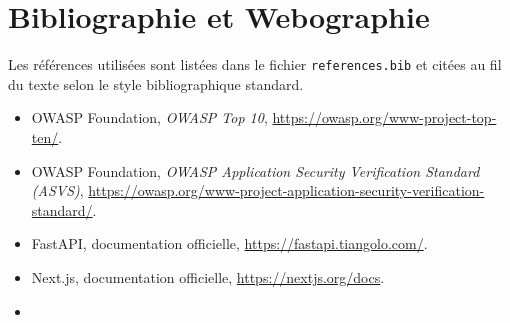\chapter{Bibliographie et Webographie}

Les références utilisées sont listées dans le fichier \texttt{references.bib} et citées
au fil du texte selon le style bibliographique standard. 

\begin{itemize}
    \item OWASP Foundation, \emph{OWASP Top 10}, \url{https://owasp.org/www-project-top-ten/}.
    \item OWASP Foundation, \emph{OWASP Application Security Verification Standard
    (ASVS)}, \url{https://owasp.org/www-project-application-security-verification-standard/}.
    \item FastAPI, documentation officielle, \url{https://fastapi.tiangolo.com/}.
    \item Next.js, documentation officielle, \url{https://nextjs.org/docs}.
    \item {}
\end{itemize}
